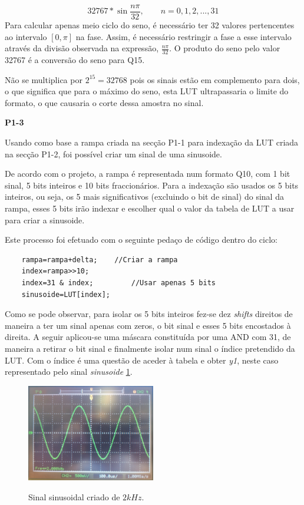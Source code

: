 \documentclass[11pt]{article}
\begin{document}
\begin{equation}
32767*\sin \dfrac{n \pi}{32},  \quad \quad n=0,1,2,...,31
\end{equation}
Para calcular apenas meio ciclo do seno, é necessário ter 32 valores pertencentes ao intervalo $[0,\pi]$ na fase. Assim, é necessário restringir a fase a esse intervalo através da divisão observada na expressão, $\frac{n \pi}{32}$. O produto do seno pelo valor 32767 é a conversão do seno para Q15. 

Não se multiplica por $2 ^{15}=32768$ pois os sinais estão em complemento para dois, o que significa que para o máximo do seno, esta LUT ultrapassaria o limite do formato, o que causaria o corte dessa amostra no sinal.
\vspace{2 mm}

\textbf{P1-3}
\label{para:P1-3}

Usando como base a rampa criada na secção P1-1 para indexação da LUT criada na secção P1-2, foi possível criar um sinal de uma sinusoide.

De acordo com o projeto, a rampa é representada num formato Q10, com 1 bit sinal, 5 bits inteiros e 10 bits fraccionários. 
Para a indexação são usados os 5 bits inteiros, ou seja, os 5 mais significativos (excluindo o bit de sinal) do sinal da rampa, esses 5 bits irão indexar e escolher qual o valor da tabela de LUT a usar para criar a sinusoide. 

Este processo foi efetuado com o seguinte pedaço de código dentro do ciclo:

\begin{lstlisting}
	rampa=rampa+delta;    //Criar a rampa
	index=rampa>>10;
	index=31 & index;         //Usar apenas 5 bits
	sinusoide=LUT[index];
\end{lstlisting}

Como se pode observar, para isolar os 5 bits inteiros fez-se dez \textit{shifts} direitos de maneira a ter um sinal apenas com zeros, o bit sinal e esses 5 bits encostados à direita. A seguir aplicou-se uma máscara constituída por uma AND com 31, de maneira a retirar o bit sinal e finalmente isolar num sinal o índice pretendido da LUT. Com o índice é uma questão de aceder à tabela e obter \textit{y1}, neste caso representado pelo sinal \textit{sinusoide} \ref{tab:sen_2k}.

\begin{figure}[H]
	\centering
	\label{tab:sen_2k}
	\includegraphics[width=0.5\textwidth]{./P1_1seno}~\\
	\caption{Sinal sinusoidal criado de $ 2 kHz $.}
\end{figure}
\end{document}
